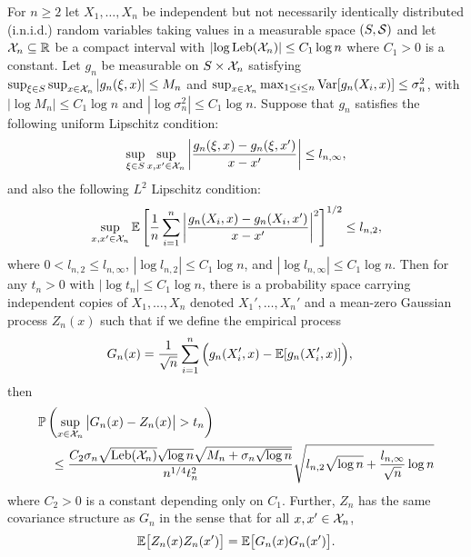 \begin{lemma}
  \label{lem:kernel_app_yurinskii_corollary}

  For $n \geq 2$ let $X_1, \dots, X_n$
  be independent but not necessarily identically distributed
  (i.n.i.d.) random variables
  taking values in a measurable space $(S, \mathcal{S})$
  and let $\mathcal{X}_n \subseteq \mathbb{R}$
  be a compact interval
  with $\left|\log \operatorname{Leb}(\mathcal{X}_n)\right| \leq C_1 \log n$
  where $C_1 > 0$ is a constant.
  Let $g_n$ be measurable on $S \times \mathcal{X}_n$ satisfying
  $\sup_{\xi \in S} \sup_{x \in \mathcal{X}_n} |g_n(\xi, x)| \leq M_n$
  and
  $\sup_{x \in \mathcal{X}_n} \max_{1 \leq i \leq n} \operatorname{Var}[g_n(X_i, x)]
  \leq \sigma_n^2$,
  with $\left|\log M_n\right| \leq C_1 \log n$
  and $\left|\log \sigma_n^2\right| \leq C_1 \log n$.
  Suppose that $g_n$ satisfies the following uniform
  Lipschitz condition:
  \begin{align*}
    \sup_{\xi \in S}
    \sup_{x,x' \in \mathcal{X}_n}
    \left|
    \frac{g_n(\xi, x) - g_n(\xi, x')}
    {x-x'}
    \right|
    \leq
    l_{n,\infty},
  \end{align*}
  and also the following $L^2$
  Lipschitz condition:
  \begin{align*}
    \sup_{x,x' \in \mathcal{X}_n}
    \mathbb{E}\left[
      \frac{1}{n}
      \sum_{i=1}^n
      \left|
      \frac{g_n(X_i, x) - g_n(X_i, x')}
      {x-x'}
      \right|^2
    \right]^{1/2}
    \leq
    l_{n,2},
  \end{align*}
  where $0 < l_{n,2} \leq l_{n,\infty}$,
  $\left|\log l_{n,2}\right| \leq C_1 \log n$, and
  $\left|\log l_{n,\infty}\right| \leq C_1 \log n$.
  Then for any $t_n > 0$ with
  $\left|\log t_n\right| \leq C_1 \log n$,
  there is a probability space carrying
  independent copies of $X_1, \ldots, X_n$ denoted $X_1', \ldots, X_n'$
  and a mean-zero Gaussian process $Z_n(x)$
  such that if we define the empirical process
  \begin{align*}
    G_n(x)
    &=
    \frac{1}{\sqrt n}
    \sum_{i=1}^n
    \Big(
      g_n(X'_i,x)
      - \mathbb{E}[g_n(X'_i,x)]
    \Big),
  \end{align*}
  then
  \begin{align*}
    &\mathbb{P}\left(
      \sup_{x \in \mathcal{X}_n}
      \big|
      G_n(x) - Z_n(x)
      \big|
      > t_n
    \right) \\
    &\quad\leq
    \frac{
      C_2
      \sigma_n
      \sqrt{\operatorname{Leb}(\mathcal{X}_n)}
      \sqrt{\log n}
      \sqrt{M_n + \sigma_n\sqrt{\log n}}
    }{n^{1/4} t_n^2}
    \sqrt{
      l_{n,2}
      \sqrt{\log n}
      + \frac{l_{n,\infty}}{\sqrt n}
    \log n}
  \end{align*}
  where $C_2 > 0$ is a constant depending only on $C_1$.
  Further, $Z_n$
  has the same covariance structure as $G_n$
  in the sense that for all $x, x' \in \mathcal{X}_n$,
  \begin{align*}
    \mathbb{E}\big[Z_n(x) Z_n(x')\big]
    = \mathbb{E}\big[G_n(x) G_n(x')\big].
  \end{align*}

\end{lemma}

